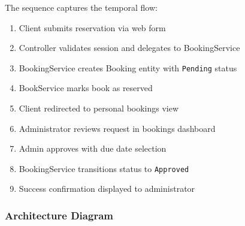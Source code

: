 \documentclass[12pt,a4paper]{article}
\begin{document}
The sequence captures the temporal flow:

\begin{enumerate}[leftmargin=*]
\item Client submits reservation via web form
\item Controller validates session and delegates to BookingService
\item BookingService creates Booking entity with \texttt{Pending} status
\item BookService marks book as reserved
\item Client redirected to personal bookings view
\item Administrator reviews request in bookings dashboard
\item Admin approves with due date selection
\item BookingService transitions status to \texttt{Approved}
\item Success confirmation displayed to administrator
\end{enumerate}

\subsubsection{Architecture Diagram}
\end{document}

